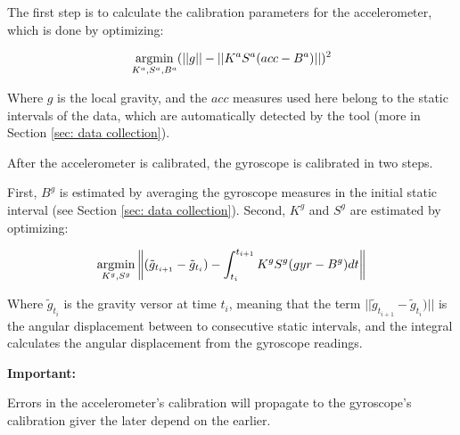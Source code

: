 The first step is to calculate the calibration parameters for the accelerometer, which is done by optimizing:

\begin{equation}\label{eq: acc opt}
	\operatorname*{argmin}_{K^a, S^a, B^a} (||g|| - ||K^aS^a(acc - B^a)||)^2
\end{equation}

Where $g$ is the local gravity, and the $acc$ measures used here belong to the static intervals of the data, which are automatically detected by the tool (more in Section \ref{sec: data collection}).

After the accelerometer is calibrated, the gyroscope is calibrated in two steps.

First, $B^g$ is estimated by averaging the gyroscope measures in the initial static interval (see Section \ref{sec: data collection}).
%
Second, $K^g$ and $S^g$ are estimated by optimizing:

\begin{equation}\label{eq: gyr opt}
	\operatorname*{argmin}_{K^g, S^g} \left\|(\tilde{g}_{t_{i+1}}-\tilde{g}_{t_i}) - \int_{t_i}^{t_{i+1}} K^gS^g(gyr - B^g)dt\right\|
\end{equation}

Where $\tilde{g}_{t_i}$ is the gravity versor at time $t_i$, meaning that the term $||\tilde{g}_{t_{i+1}}-\tilde{g}_{t_i})||$ is the angular displacement between to consecutive static intervals, and the integral calculates the angular displacement from the gyroscope readings.

\textbf{Important:}
\begin{important}
	Errors in the accelerometer's calibration will propagate to the gyroscope's calibration giver the later depend on the earlier. 
\end{important}
